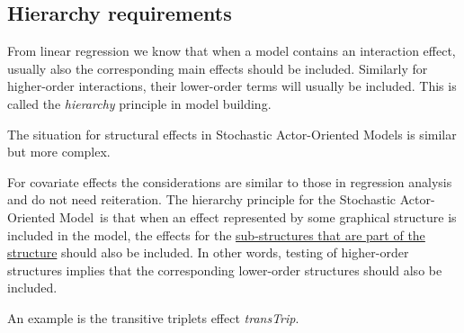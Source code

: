 \documentclass[a4paper,fleqn,11pt]{article}
\newcommand{\+}{\, + \,}
\newcommand{\saom}{{Stochastic Actor-Oriented Model}}
\begin{document}
\subsection{Hierarchy requirements}



From linear regression we know that when a model contains an interaction
effect, usually also the corresponding main effects should be included.
Similarly for higher-order interactions, their lower-order terms
will usually be included.
This is called the \emph{hierarchy} principle in model building.

The situation for structural effects in {\saom}s is similar but more complex.

For covariate effects the considerations are similar to those
in regression analysis and do not need reiteration.
The hierarchy principle for the \saom\ is that when an effect
represented by some graphical structure is included in the model,
the effects for the \underline{sub-structures that are part of the
structure} should also be included.
In other words, testing of higher-order structures implies that
the corresponding lower-order structures should also be included.

An example is the transitive triplets effect \textit{transTrip}.
\end{document}
